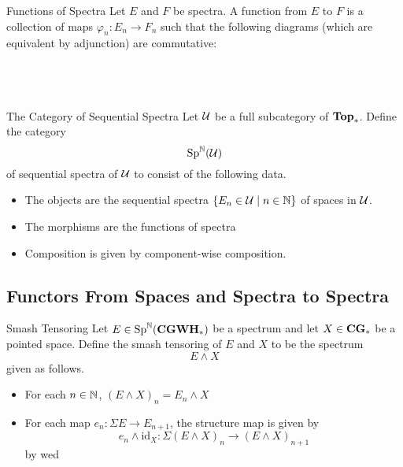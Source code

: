 \documentclass[a4paper]{article}
\begin{document}
\begin{defn}{Functions of Spectra}{} Let $E$ and $F$ be spectra. A function from $E$ to $F$ is a collection of maps $\varphi_n:E_n\to F_n$ such that the following diagrams (which are equivalent by adjunction) are commutative: \\~\\
\\~\\
\end{defn}

\begin{defn}{The Category of Sequential Spectra}{} Let $\mathcal{U}$ be a full subcategory of $\bold{Top}_\ast$. Define the category $$\text{Sp}^{\mathbb{N}}(\mathcal{U})$$ of sequential spectra of $\mathcal{U}$ to consist of the following data. 
\begin{itemize}
\item The objects are the sequential spectra $\{E_n\in\mathcal{U}\;|\;n\in\mathbb{N}\}$ of spaces in $\mathcal{U}$. 
\item The morphisms are the functions of spectra
\item Composition is given by component-wise composition. 
\end{itemize}
\end{defn}

\subsection{Functors From Spaces and Spectra to Spectra}
\begin{defn}{Smash Tensoring}{} Let $E\in\text{Sp}^{\mathbb{N}}(\bold{CGWH}_\ast)$ be a spectrum and let $X\in\bold{CG}_\ast$ be a pointed space. Define the smash tensoring of $E$ and $X$ to be the spectrum $$E\wedge X$$ given as follows. 
\begin{itemize}
\item For each $n\in\mathbb{N}$, $(E\wedge X)_n=E_n\wedge X$
\item For each map $e_n:\Sigma E\to E_{n+1}$, the structure map is given by $$e_n\wedge\text{id}_X:\Sigma(E\wedge X)_n\to(E\wedge X)_{n+1}$$ by wed
\end{itemize}
\end{defn}
\end{document}
